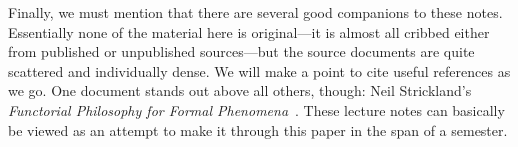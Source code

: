 Finally, we must mention that there are several good companions to these notes.  Essentially none of the material here is original---it is almost all cribbed either from published or unpublished sources---but the source documents are quite scattered and individually dense.  We will make a point to cite useful references as we go.  One document stands out above all others, though: Neil Strickland's \textit{Functorial Philosophy for Formal Phenomena}~\cite{StricklandFPFP}.  These lecture notes can basically be viewed as an attempt to make it through this paper in the span of a semester.
